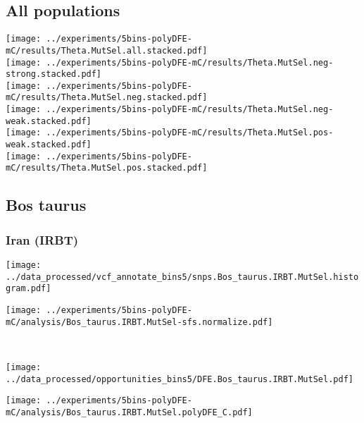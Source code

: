 \subsection{All populations}
\begin{center}
    \texttt{[image: ../experiments/5bins-polyDFE-mC/results/Theta.MutSel.all.stacked.pdf]} \\
    \texttt{[image: ../experiments/5bins-polyDFE-mC/results/Theta.MutSel.neg-strong.stacked.pdf]} \\
    \texttt{[image: ../experiments/5bins-polyDFE-mC/results/Theta.MutSel.neg.stacked.pdf]} \\
    \texttt{[image: ../experiments/5bins-polyDFE-mC/results/Theta.MutSel.neg-weak.stacked.pdf]} \\
    \texttt{[image: ../experiments/5bins-polyDFE-mC/results/Theta.MutSel.pos-weak.stacked.pdf]} \\
    \texttt{[image: ../experiments/5bins-polyDFE-mC/results/Theta.MutSel.pos.stacked.pdf]}

\end{center}

\subsection{Bos taurus}

\subsubsection{Iran (IRBT)}

\begin{minipage}{0.49\linewidth}
    \texttt{[image: ../data\_processed/vcf\_annotate\_bins5/snps.Bos\_taurus.IRBT.MutSel.histogram.pdf]}
\end{minipage}
\begin{minipage}{0.49\linewidth}
    \texttt{[image: ../experiments/5bins-polyDFE-mC/analysis/Bos\_taurus.IRBT.MutSel-sfs.normalize.pdf]}
\end{minipage}
\\
\begin{minipage}{0.49\linewidth}
    \texttt{[image: ../data\_processed/opportunities\_bins5/DFE.Bos\_taurus.IRBT.MutSel.pdf]}
\end{minipage}
\begin{minipage}{0.49\linewidth}
    \texttt{[image: ../experiments/5bins-polyDFE-mC/analysis/Bos\_taurus.IRBT.MutSel.polyDFE\_C.pdf]}
\end{minipage}
\\

